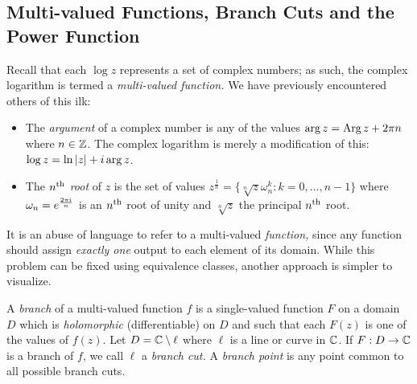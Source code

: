 \goodbreak



\subsection[Multi-valued Functions]{Multi-valued Functions, Branch Cuts and the Power Function}\label{sec:multivalued}%

Recall that each $\log z$ represents a set of complex numbers; as such, the complex logarithm is termed a \emph{multi-valued function.} We have previously encountered others of this ilk:
\begin{itemize}
  \item The \emph{argument} of a complex number is any of the values $\arg z=\operatorname{Arg} z+2\pi n$ where $n\in\mathbb{Z}$. The complex logarithm is merely a modification of this: $\log z=\ln\left| z\right|+i\arg z$.
  \item The \emph{$n\textsuperscript{th}$ root} of $z$ is the set of values $z^{\frac 1n}=\{\sqrt[n]{z}\omega_n^k:k=0,\ldots,n-1\}$ where $\omega_n=e^{\frac{2\pi i}{n}}$ is an $n\textsuperscript{th}$ root of unity and $\sqrt[n]{z}$ the principal $n\textsuperscript{th}$ root.
\end{itemize}
It is an abuse of language to refer to a multi-valued \emph{function,} since any function should assign \emph{exactly one} output to each element of its domain. While this problem can be fixed using equivalence classes, another approach is simpler to visualize.

\begin{defn}{}{}
	A \emph{branch} of a multi-valued function $f$ is a single-valued function $F$ on a domain $D$ which is \emph{holomorphic} (differentiable) on $D$ and such that each $F(z)$ is one of the values of $f(z)$.\smallbreak
	Let $D=\mathbb{C}\setminus\ell$ where $\ell$ is a line or curve in $\mathbb{C}$. If $F:D\to\mathbb{C}$ is a branch of $f$, we call $\ell$ a \emph{branch cut.} A \emph{branch point} is any point common to all possible branch cuts.
\end{defn}

